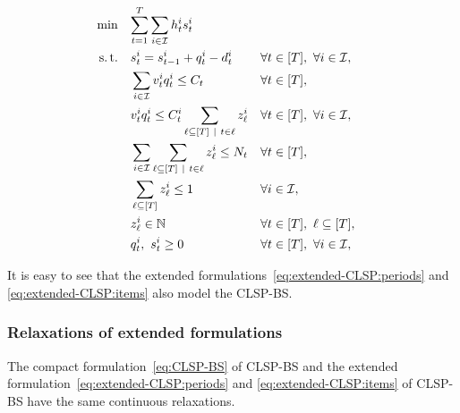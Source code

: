 \begin{subequations}\label{eq:extended-CLSP:items}
  \begin{align}
    \min\quad & \rlap{$\ds \sum_{t=1}^{\horizon} \sum_{i\in\REF} \holding_t^i \inventory_t^i$}
    \label{eq:extended-CLSP:items:objective}
    \\
    \st\quad & \ds \inventory_t^i = \inventory_{t-1}^i + \quantity_t^i - \demand_t^i && \forall t\in\range{\horizon},\ \forall i\in\REF,
    \label{eq:extended-CLSP:items:inventory-dynamic}
    \\
    & \ds \sum_{i\in\REF} \rate_t^i \quantity_t^i \le \capacity_t && \forall t\in\range{\horizon},
    \label{eq:extended-CLSP:items:capacity}
    \\
    & \ds \rate_t^i \quantity_t^i \le \capacity_t^i \sum_{\ell\subseteq{\range{\horizon}}~|~t\in\ell} z_{\ell}^i && \forall t\in\range{\horizon},\ \forall i\in\REF,
    \label{eq:extended-CLSP:items:item-capacity}
    \\
    & \ds \sum_{i\in\REF} \sum_{\ell\subseteq\range{\horizon}~|~t\in\ell} z_{\ell}^i \le \nbsetups_t && \forall t\in\range{\horizon},
    \label{eq:extended-CLSP:items:setups}
    \\
    & \ds \sum_{\ell\subseteq\range{\horizon}} z_{\ell}^i \le 1 && \forall i\in\REF,
    \label{eq:extended-CLSP:items:unique-pattern}
    \\
    & \ds z_{\ell}^i \in \NN && \forall t\in\range{\horizon},\ \ell\subseteq\range{\horizon},
    \label{eq:extended-CLSP:items:pattern}
    \\
    & \ds \quantity_t^i,\ \inventory_t^i \ge 0 && \forall t\in\range{\horizon},\ \forall i\in\REF,
    \label{eq:extended-CLSP:items:positivity}
  \end{align}
\end{subequations}


It is easy to see that the extended formulations~\eqref{eq:extended-CLSP:periods} and \eqref{eq:extended-CLSP:items} also model the CLSP-BS.



\subsubsection{Relaxations of extended formulations}



\begin{prop}\label{prop:extended-relaxation}
The compact formulation~\eqref{eq:CLSP-BS} of CLSP-BS and the extended formulation~\eqref{eq:extended-CLSP:periods} and \eqref{eq:extended-CLSP:items} of CLSP-BS have the same continuous relaxations.
\end{prop}


